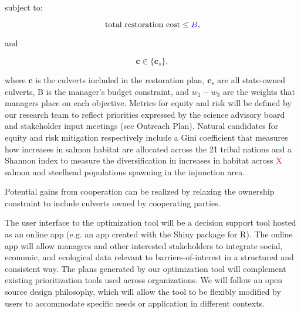 \documentclass[12pt]{elsarticle}
\begin{document}
\noindent subject to:

\begin{equation*}
\text{total restoration cost} \le \textcolor{blue}{B},
\end{equation*}

\noindent and

\begin{equation*}
\boldsymbol{c} \in \{\boldsymbol{c}_s  \},
\end{equation*}

where $\boldsymbol{c}$ is the culverts included in the restoration plan, $\boldsymbol{c}_s$ are all state-owned culverts, B is the manager's budget constraint, and $w_1-w_3$ are the weights that managers place on each objective. Metrics for equity and risk will be defined by our research team to reflect priorities expressed by the science advisory board and stakeholder input meetings (see Outreach Plan). Natural candidates for equity and risk mitigation respectively include a Gini coefficient that measures how increases in salmon habitat are allocated across the 21 tribal nations and a Shannon index to measure the diversification in increases in habitat across \textcolor{red}{X} salmon and steelhead populations spawning in the injunction area.

Potential gains from cooperation can be realized by relaxing the ownership constraint to include culverts owned by cooperating parties.


The user interface to the optimization tool will be a decision support tool hosted as an online app (e.g. an app created with the Shiny package for R). The online app will allow managers and other interested stakeholders to integrate social, economic, and ecological data relevant to barriers-of-interest in a structured and consistent way. The plans generated by our optimization tool will complement existing prioritization tools used across organizations. We will follow an open source design philosophy, which will allow the tool to be flexibly modified by users to accommodate specific needs or application in different contexts. %
\end{document}
